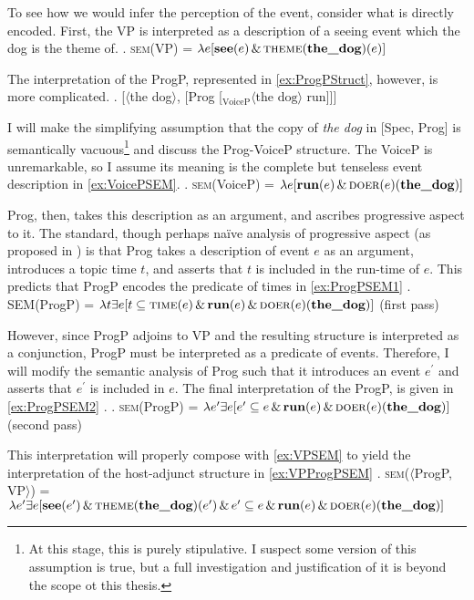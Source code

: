 \documentclass[MilwayThesis]{subfiles}
\begin{document}
To see how we would infer the perception of the event, consider what is directly encoded.
First, the VP is interpreted as a description of a seeing event which the dog is the theme of.
\ex.\label{ex:VPSEM} \textsc{sem}(VP) = $\lambda e [\textbf{see}(e)\,\&\,\textsc{theme}(\textbf{the\_dog})(e)]$

The interpretation of the ProgP, represented in \cref{ex:ProgPStruct}, however, is more complicated.
\ex.\label{ex:ProgPStruct} [$\langle$the dog$\rangle$, [Prog [$_\text{VoiceP} \langle\text{the dog}\rangle$ run]]]

I will make the simplifying assumption that the copy of \textit{the dog} in [Spec, Prog] is semantically vacuous\footnote{
	At this stage, this is purely stipulative.
	I suspect some version of this assumption is true, but a full investigation and justification of it is beyond the scope ot this thesis.
} and discuss the Prog-VoiceP structure.
The VoiceP is unremarkable, so I assume its meaning is the complete but tenseless event description in \cref{ex:VoicePSEM}.
\ex.\label{ex:VoicePSEM} \textsc{sem}(VoiceP) = $\lambda e [\textbf{run}(e)\,\&\,\textsc{doer}(e)(\textbf{the\_dog})]$

Prog, then, takes this description as an argument, and ascribes progressive aspect to it.
The standard, though perhaps na\"ive analysis of progressive aspect (as proposed in \cite{klein1994time}) is that Prog takes a description of event $e$ as an argument, introduces a topic time $t$, and asserts that $t$ is included in the run-time of $e$.
This predicts that ProgP encodes the predicate of times in \cref{ex:ProgPSEM1}
\ex.\label{ex:ProgPSEM1} \textsc{SEM}(ProgP) =  $\lambda t \exists e [t \subseteq \textsc{time}(e)\,\&\,\textbf{run}(e)\,\&\,\textsc{doer}(e)(\textbf{the\_dog})]$ (first pass)

However, since ProgP adjoins to VP and the resulting structure is interpreted as a conjunction, ProgP must be interpreted as a predicate of events.
Therefore, I will modify the semantic analysis of Prog such that it introduces an event $e^{\prime}$ and asserts that $e^{\prime}$ is included in $e$.
The final interpretation of the ProgP, is given in \cref{ex:ProgPSEM2} \parencite[cf.][]{bjorkman2018poster}.
\ex.\label{ex:ProgPSEM2} \textsc{sem}(ProgP) =  $\lambda e^{\prime} \exists e [e^{\prime} \subseteq e\,\&\,\textbf{run}(e)\,\&\,\textsc{doer}(e)(\textbf{the\_dog})]$ (second pass)

This interpretation will properly compose with \cref{ex:VPSEM} to yield the interpretation of the host-adjunct structure in \cref{ex:VPProgPSEM}
\ex.\label{ex:VPProgPSEM} \textsc{sem}($\langle$ProgP, VP$\rangle$) = $\lambda e^{\prime} \exists e [ \textbf{see}(e^{\prime})\,\&\,\textsc{theme}(\textbf{the\_dog})(e^{\prime})\,\&\,e^{\prime} \subseteq e\,\&\,\textbf{run}(e)\,\&\,\textsc{doer}(e)(\textbf{the\_dog})]$
\end{document}
